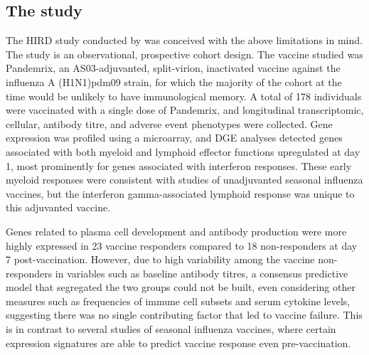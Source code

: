 \subsection{The  study}

The \gls{HIRD} study conducted by \textcite{sobolev2016AdjuvantedInfluenzaH1N1Vaccination} was conceived with the above limitations in mind.
The study is an observational, prospective cohort design.
The vaccine studied was Pandemrix, an AS03-adjuvanted, split-virion, inactivated vaccine against the influenza A (H1N1)pdm09 strain, for which the majority of the cohort at the time would be unlikely to have immunological memory.
A total of 178 individuals were vaccinated with a single dose of Pandemrix, and longitudinal transcriptomic, cellular, antibody
titre, and adverse event phenotypes were collected.
Gene expression was profiled using a microarray, and \gls{DGE} analyses detected genes associated with both myeloid and lymphoid effector functions upregulated at day 1, most prominently for genes associated with interferon responses.
These early myeloid responses were consistent with studies of unadjuvanted seasonal influenza vaccines, but the interferon gamma-associated lymphoid response was unique to this adjuvanted vaccine.

Genes related to plasma cell development and antibody production were more highly expressed in 23 vaccine responders compared to 18 non-responders at day 7 post-vaccination.
However, due to high variability among the vaccine non-responders in variables such as baseline antibody titres, a consensus predictive model that segregated the two groups could not be built, even considering other measures such as frequencies of immune cell subsets and serum cytokine levels, suggesting there was no single contributing factor that led to vaccine failure.
This is in contrast to several studies of seasonal influenza vaccines, where certain expression signatures are able to predict vaccine response even pre-vaccination\autocite{furman2013ApoptosisOtherImmune, tsang2014GlobalAnalysesHuman, nakaya2015SystemsAnalysisImmunity, hipc-chisignaturesprojectteam2017MulticohortAnalysisReveals}.


